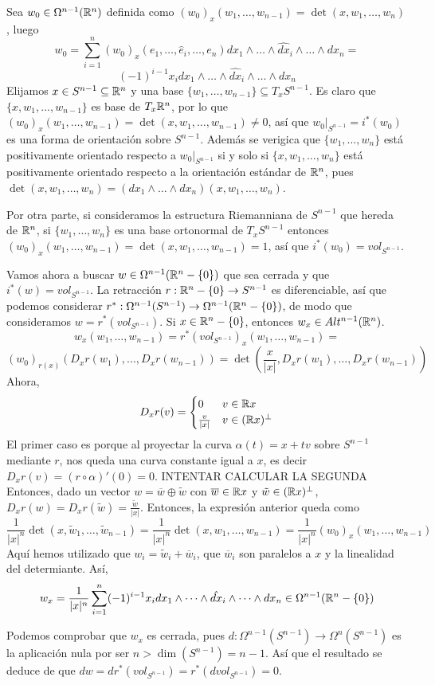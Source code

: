 \documentclass[CV.tex]{subfiles}
\begin{document}
\begin{ej}
Sea $w_0\in\Omega^{n-1}(\mathbb{R}^n)$ definida como $(w_0)_x(w_1,\dots, w_{n-1})=\det(x,w_1,\dots, w_n)$, luego
\[
w_0=\sum_{i=1}^n (w_0)_x(e_1,\dots, \hat{e}_i, \dots, e_n) dx_1\land\dots\land \hat{dx}_i\land\dots\land dx_n=
\]
\[
(-1)^{i-1}x_i dx_1\land\dots\land \hat{dx}_i\land\dots\land dx_n
\]
Elijamos $x\in S^{n-1}\subseteq\mathbb{R}^n$ y una base $\{w_1,\dots, w_{n-1}\}\subseteq T_x S^{n-1}$.  Es claro que $\{x, w_1,\dots, w_{n-1}\}$ es base de $T_x\mathbb{R}^n$, por lo que $(w_0)_x(w_1,\dots, w_{n-1})=\det(x,w_1,\dots, w_{n-1})\neq 0$, así que $w_0|_{S^{n-1}}=i^*(w_0)$ es una forma de orientación sobre $S^{n-1}$. Además se verigica que $\{w_1,\dots, w_n\}$ está positivamente orientado respecto a $w_0|_{S^{n-1}}$ si y solo si $\{x,w_1,\dots, w_n\}$ está positivamente orientado respecto a la orientación estándar de $\mathbb{R}^n$, pues $\det(x,w_1,\dots, w_n)=(dx_1\land\dots\land dx_n)(x, w_1,\dots, w_n)$. 

Por otra parte, si consideramos la estructura Riemanniana de $S^{n-1}$ que hereda de $\mathbb{R}^n$, si $\{w_1,\dots, w_n\}$ es una base ortonormal de $T_xS^{n-1}$ entonces $(w_0)_x(w_1,\dots, w_{n-1})=\det(x,w_1,\dots, w_{n-1})=1$, así que $i^*(w_0)=vol_{S^{n-1}}$.

Vamos ahora a buscar $w\in\Omega^{n-1}(\mathbb{R}^n-\{0\})$ que sea cerrada y que $i^*(w)=vol_{S^{n-1}}$. La retracción $r:\mathbb{R}^n-\{0\}\to S^{n-1}$ es diferenciable, así que podemos considerar $r^*:\Omega^{n-1}(S^{n-1})\to \Omega^{n-1}(\mathbb{R}^n-\{0\})$, de modo que consideramos $w=r^*(vol_{S^{n-1}})$. Si $x\in\mathbb{R}^n-\{0\}$, entonces $w_x\in Alt^{n-1}(\mathbb{R}^n)$.
\[
w_x(w_1,\dots, w_{n-1})=r^*(vol_{S^{n-1}})_x(w_1,\dots, w_{n-1})=
\]
\[
(w_0)_{r(x)}(D_x r(w_1),\dots, D_x r(w_{n-1}))=\det\left(\frac{x}{|x|}, D_x r(w_1),\dots, D_x r(w_{n-1})\right)
\]
Ahora, 
\[
D_xr(v)=\begin{cases}
0 & v\in\mathbb{R} x\\
\frac{v}{|x|} & v\in(\mathbb{R} x)^{\perp}
\end{cases}
\]
El primer caso es porque al proyectar la curva $\alpha(t)=x+tv$ sobre $S^{n-1}$ mediante $r$, nos queda una curva constante igual a $x$, es decir $D_xr(v)=(r\circ \alpha)'(0)=0$. 
INTENTAR CALCULAR LA SEGUNDA
Entonces, dado un vector $w=\overline{w}\oplus\tilde{w}$ con $\overline{w}\in\mathbb{R} x$ y $\tilde{w}\in (\mathbb{R} x)^{\perp}$, $D_xr(w)=D_xr(\tilde{w})=\frac{\tilde{w}}{|x|}$. Entonces, la expresión anterior queda como
\[
\frac{1}{|x|^n}\det(x,\tilde{w}_1,\dots, \tilde{w}_{n-1})=\frac{1}{|x|^n}\det(x,w_1,\dots, w_{n-1})=\frac{1}{|x|^n}(w_0)_x(w_1,\dots, w_{n-1})
\]
Aquí hemos utilizado que $w_i=\tilde{w}_i+\overline{w}_i$, que $\overline{w}_i$ son paralelos a $x$ y la linealidad del determiante. Así,
\[
w_x=\frac{1}{|x|^n}\sum_{i=1}^n(-1)^{i-1} x_i dx_1\land\dots\land\hat{dx}
_i\land\dots\land dx_n\in\Omega^{n-1}(\mathbb{R}^n-\{0\})\]

Podemos comprobar que $w_x$ es cerrada, pues $d:\Omega^{n-1}(S^{n-1})\to \Omega^n(S^{n-1})$ es la aplicación nula por ser $n>\dim(S^{n-1})=n-1$. Así que el resultado se deduce de que $dw=d r^*(vol_{S^{n-1}})=r^*(d vol_{S^{n-1}})=0$.  
\end{ej}
\end{document}
